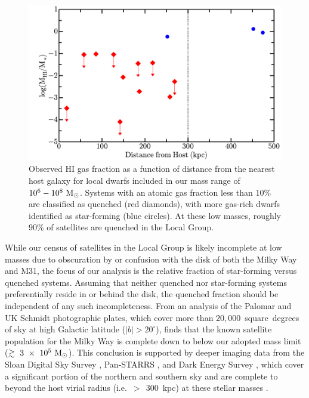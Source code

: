 \begin{figure}
 \centering
 \hspace*{-0.08in}
 \includegraphics[width=6.5in]{tcbflash/f2.pdf}
 \caption[HI gas fraction for LG dwarf galaxies]{Observed H{\scriptsize I} gas fraction as a function of
   distance from the nearest host galaxy for local dwarfs included in
   our mass range of $10^6-10^{8}~{\rm M}_{\odot}$. Systems with an atomic gas
   fraction less than $10\%$ are classified as quenched (red
   diamonds), with more gas-rich dwarfs identified as star-forming
   (blue circles). At these low masses, roughly $90\%$ of satellites
   are quenched in the Local Group.}
 \label{fig:h1}
\end{figure}

While our census of satellites in the Local Group is likely incomplete
at low masses due to obscuration by or confusion with the disk of both
the Milky Way and M31, the focus of our analysis is the relative
fraction of star-forming versus quenched systems. Assuming that
neither quenched nor star-forming systems preferentially reside in or
behind the disk, the quenched fraction should be independent of any
such incompleteness. From an analysis of the Palomar and UK Schmidt
photographic plates, which cover more than $20,000$~square~degrees of
sky at high Galactic latitude ($|b| > 20^{\circ}$), \citet{irwin94}
finds that the known satellite population for the Milky Way is
complete down to below our adopted mass limit
($\gtrsim~3~\times~10^{5}~{\rm M}_{\odot}$). This conclusion is supported by
deeper imaging data from the Sloan Digital Sky Survey
\citep[SDSS,][]{york00}, Pan-STARRS \citep{kaiser10}, and Dark Energy
Survey \citep[DES,][]{DES14}, which cover a significant portion of the
northern and southern sky and are complete to beyond the host virial
radius (i.e.~$>~\!~300$~kpc) at these stellar masses
\citep{tollerud08, koposov08, laevens14, koposov15, DES15}.



